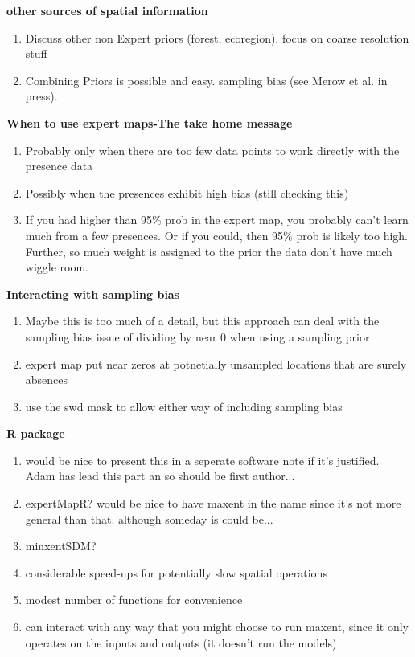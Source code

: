 \textbf{other sources of spatial information} 

\begin{enumerate}
	\item Discuss other non Expert priors (forest,  ecoregion). focus on coarse resolution stuff
	\item Combining Priors is possible and easy. sampling bias (see Merow et al. in press).
\end{enumerate}


\textbf{When to use expert maps-The take home message} 

\begin{enumerate}
  \item Probably only when there are too few data points to work directly with the presence data
  \item Possibly when the presences exhibit high bias (still checking this)
  \item If you had higher than 95\% prob in the expert map, you probably can't learn much from a few presences. Or if you could, then 95\% prob is likely too high. Further, so much weight is assigned to the prior the data don't have much wiggle room.
\end{enumerate}


\textbf{Interacting with sampling bias} 

\begin{enumerate}
  \item Maybe this is too much of a detail, but this approach can deal with the sampling bias issue of dividing by near 0 when using a sampling prior
  \item expert map put near zeros at potnetially unsampled locations that are surely absences
  \item use the swd mask to allow either way of including sampling bias
\end{enumerate}


\textbf{R package} 

\begin{enumerate}
  \item would be nice to present this in a seperate software note if it's justified. Adam has lead this part an so should be first author... 
  \item expertMapR? would be nice to have maxent in the name since it's not more general than that. although someday is could be...
  \item minxentSDM?
  \item considerable speed-ups for potentially slow spatial operations
  \item modest number of functions for convenience
  \item can interact with any way that you might choose to run maxent, since it only operates on the inputs and outputs (it doesn't run the models)
\end{enumerate}
